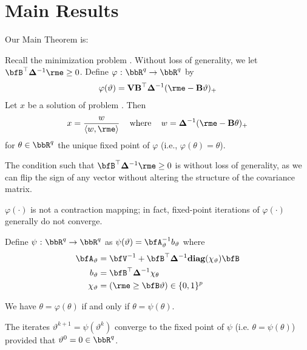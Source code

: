 \documentclass[12pt,leqno,letterpaper]{article}
\begin{document}
\section{Main Results}
Our Main Theorem is:
\begin{theorem}\label{thm1}
Recall the minimization problem  .  Without loss of generality, we let $\bfB^\top \bdel^{-1} \rme \ge 0$.
Define  $\varphi \cst \bbR^q \to \bbR^q$ by
\begin{align}\label{phi}
\varphi (\vartheta) = \mat{V} \mat{B}^\top
\bdel^{-1} (\rme - \mat{B} \vartheta)_+
\end{align}
 Let $x$ be a solution of 
problem . Then
\begin{align}
   x = \frac{w}{\prj{w}{\rme}}
  \hspace{0.16in}
  \text{where} 
  \hspace{0.16in} 
   w = \bdel^{-1} (\rme - \mat{B} \theta)_+
\end{align}
for $\theta \in \bbR^q$ the unique  fixed
point of $\varphi$ (i.e., $\varphi(\theta) = \theta$).
\end{theorem}
\begin{remark}
The condition such that $\bfB^\top \bdel^{-1} \rme \ge 0$ is without loss of generality, as we can flip the sign of any vector without altering the structure of the covariance matrix.
\end{remark}
\begin{remark}
$\varphi(\cdot)$ is not a contraction mapping; in fact, fixed-point iterations of $\varphi(\cdot)$ generally do not converge.
\end{remark}
Define $\psi \cst \bbR^q \to \bbR^q$ as 
$\psi (\vartheta) = \bfA^{-1}_\vartheta b_\vartheta$ where
\begin{equation}\label{linsys}
\begin{aligned}
  \bfA_\vartheta &= \bfV^{-1} + \bfB^\top \bdel^{-1}
  \textbf{diag}(\chi_\vartheta) \bfB \\
  b_\vartheta &= \bfB^\top \bdel^{-1} \chi_\theta \\
  \chi_\vartheta &= (\rme \ge \bfB \vartheta)   
  \in \{0,1\}^p
\end{aligned}
\end{equation}
\begin{lemma}
We have $\theta = \varphi(\theta)$ if and 
only if $\theta = \psi(\theta)$.
\end{lemma}
\begin{lemma}
The iterates $\vartheta^{k+1}
= \psi(\vartheta^k)$ converge to the fixed point 
of $\psi$ (i.e. $\theta = \psi(\theta)$)
provided that $\vartheta^0 = 0 \in \bbR^q$.
\end{lemma}
\end{document}
